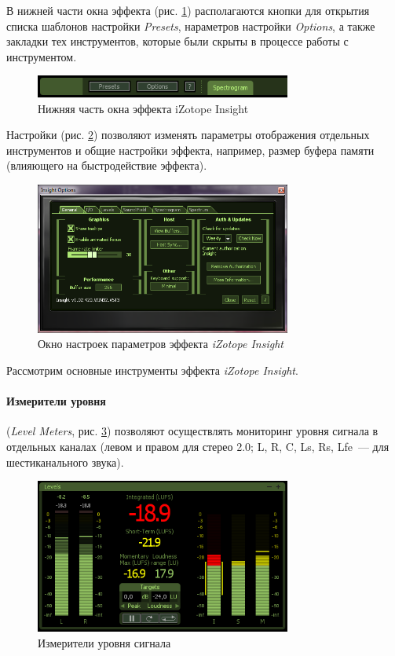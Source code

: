 \documentclass[oneside, final, 14pt]{extreport}
\begin{document}
В нижней части окна эффекта (рис. \ref{pic-insight-02}) располагаются кнопки для открытия списка шаблонов настройки \textit{Presets}, нараметров настройки \textit{Options}, а также закладки тех инструментов, которые были скрыты в процессе работы с инструментом.

\begin{figure}[h!]
\centering
\includegraphics[width=0.75\textwidth]{pic-insight-02}
\caption{Нижняя часть окна эффекта iZotope Insight}
\label{pic-insight-02}
\end{figure}

Настройки (рис. \ref{pic-insight-03}) позволяют изменять параметры отображения отдельных инструментов и общие настройки эффекта, например, размер буфера памяти (влияющего на быстродействие эффекта).

\begin{figure}[h!]
\centering
\includegraphics[width=0.75\textwidth]{pic-insight-03}
\caption{Окно настроек параметров эффекта \textit{iZotope Insight}}
\label{pic-insight-03}
\end{figure}

Рассмотрим основные инструменты эффекта \textit{iZotope Insight}.

\paragraph{Измерители уровня} (\textit{Level Meters}, рис. \ref{pic-insight-04}) позволяют осуществлять мониторинг уровня сигнала в отдельных каналах (левом и правом для стерео 2.0; L, R, C, Ls, Rs, Lfe~--- для шестиканального звука). 

\begin{figure}[h!]
\centering
\includegraphics[width=0.75\textwidth]{pic-insight-04}
\caption{Измерители уровня сигнала}
\label{pic-insight-04}
\end{figure}
\end{document}
